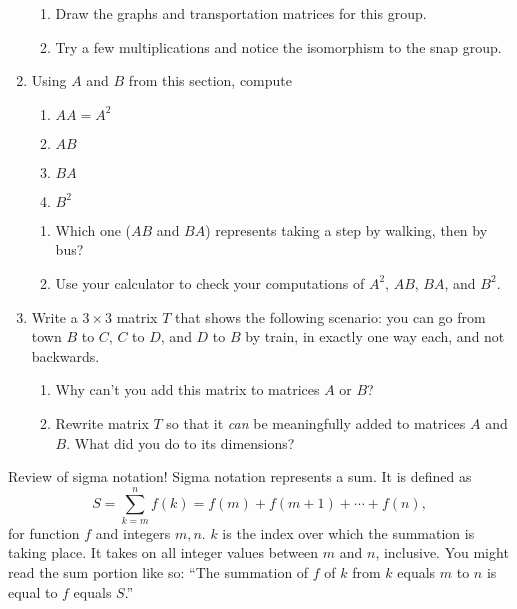 \documentclass[../gatm.tex]{subfiles}
\begin{document}
\begin{enumerate}
\begin{enumerate}
\item Draw the graphs and transportation matrices for this group.
\item Try a few multiplications and notice the isomorphism to the snap group.
\end{enumerate}
\item Using $A$ and $B$ from this section, compute
\begin{multicols}{4}
\begin{enumerate}
\item $AA=A^2$
\item $AB$
\item $BA$
\item $B^2$
\setcounter{mtrx_mult_problem_ii}{\value{enumii}}
\end{enumerate}
\end{multicols}
\begin{enumerate}
\setcounter{enumii}{\value{mtrx_mult_problem_ii}}
\item Which one ($AB$ and $BA$) represents taking a step by walking, then by bus?
\item Use your calculator to check your computations of $A^2$, $AB$, $BA$, and $B^2$.
\end{enumerate}
\item Write a $3\times 3$ matrix $T$ that shows the following scenario: you can go from town $B$ to $C$, $C$ to $D$, and $D$ to $B$ by train, in exactly one way each, and not backwards.
\begin{enumerate}
\item Why can't you add this matrix to matrices $A$ or $B$?
\item Rewrite matrix $T$ so that it \textit{can} be meaningfully added to matrices $A$ and $B$. What did you do to its dimensions?
\end{enumerate}
\setcounter{mtrx_mult_problem_i}{\value{enumi}}
\end{enumerate}

Review of sigma notation! Sigma notation represents a sum. It is defined as
$$S=\sum_{k=m}^{n} f(k)=f(m)+f(m+1)+\cdots + f(n),$$
for function $f$ and integers $m,n$. $k$ is the index over which the summation is taking place. It takes on all integer values between $m$ and $n$, inclusive. You might read the sum portion like so: ``The summation of $f$ of $k$ from $k$ equals $m$ to $n$ is equal to $f$ equals $S$.''
\end{document}

